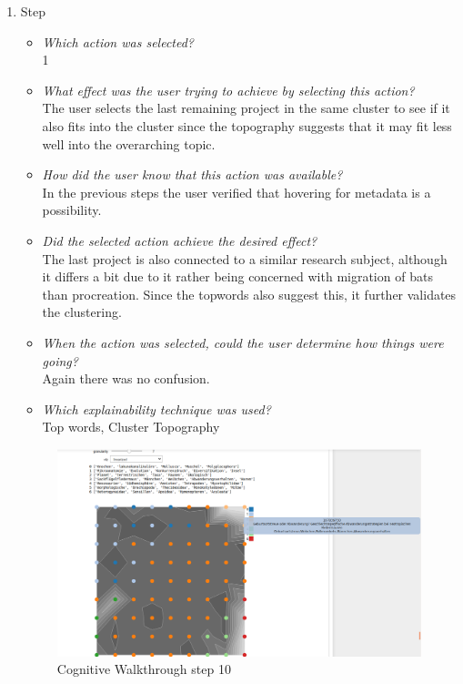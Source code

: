 {\begin{enumerate}
		\item Step
		\begin{itemize}
			\item \textit{Which action was selected?} \\
			1
			\item \textit{What effect was the user trying to achieve by selecting this action?} \\
			The user selects the last remaining project in the same cluster to see if it also fits into the cluster since the topography suggests that it may fit less well into the overarching topic. 
			\item \textit{How did the user know that this action was available?} \\
			In the previous steps the user verified that hovering for metadata is a possibility. 
			\item \textit{Did the selected action achieve the desired effect?} \\
			The last project is also connected to a similar research subject, although it differs a bit due to it rather being concerned with migration of bats than procreation. Since the topwords also suggest this, it further validates the clustering. 
			\item \textit{When the action was selected, could the user determine how things were going?} \\
			Again there was no confusion.
			\item \textit{Which explainability technique was used?}\\
			Top words, Cluster Topography
		\end{itemize}
		\begin{figure}[H]
			\centering
			\includegraphics[width=400px]{../chapters/validation/pics/8_c}
			\caption{\label{pic:step10} Cognitive Walkthrough step 10}
		\end{figure} \newpage
		

\end{enumerate}}
